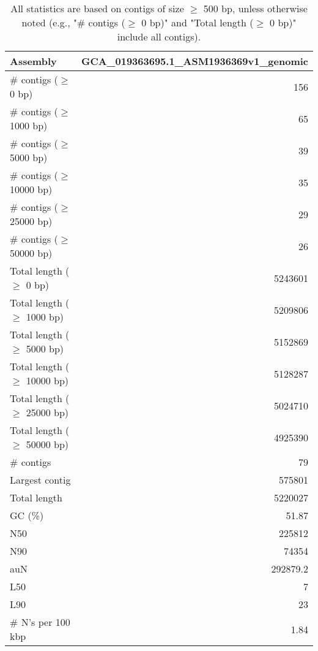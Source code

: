 \documentclass[12pt,a4paper]{article}
\begin{document}
\begin{table}[ht]
\begin{center}
\caption{All statistics are based on contigs of size $\geq$ 500 bp, unless otherwise noted (e.g., "\# contigs ($\geq$ 0 bp)" and "Total length ($\geq$ 0 bp)" include all contigs).}
\begin{tabular}{|l*{1}{|r}|}
\hline
Assembly & GCA\_019363695.1\_ASM1936369v1\_genomic \\ \hline
\# contigs ($\geq$ 0 bp) & 156 \\ \hline
\# contigs ($\geq$ 1000 bp) & 65 \\ \hline
\# contigs ($\geq$ 5000 bp) & 39 \\ \hline
\# contigs ($\geq$ 10000 bp) & 35 \\ \hline
\# contigs ($\geq$ 25000 bp) & 29 \\ \hline
\# contigs ($\geq$ 50000 bp) & 26 \\ \hline
Total length ($\geq$ 0 bp) & 5243601 \\ \hline
Total length ($\geq$ 1000 bp) & 5209806 \\ \hline
Total length ($\geq$ 5000 bp) & 5152869 \\ \hline
Total length ($\geq$ 10000 bp) & 5128287 \\ \hline
Total length ($\geq$ 25000 bp) & 5024710 \\ \hline
Total length ($\geq$ 50000 bp) & 4925390 \\ \hline
\# contigs & 79 \\ \hline
Largest contig & 575801 \\ \hline
Total length & 5220027 \\ \hline
GC (\%) & 51.87 \\ \hline
N50 & 225812 \\ \hline
N90 & 74354 \\ \hline
auN & 292879.2 \\ \hline
L50 & 7 \\ \hline
L90 & 23 \\ \hline
\# N's per 100 kbp & 1.84 \\ \hline
\end{tabular}
\end{center}
\end{table}
\end{document}
